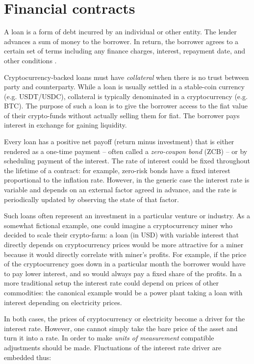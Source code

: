 \documentclass[runningheads]{llncs}
\begin{document}
\section{Financial contracts}
\label{background}

A loan is a form of debt incurred by an individual or other entity.
The lender advances a sum of money to the borrower. In return, the
borrower agrees to a certain set of terms including any finance charges,
interest, repayment date, and other conditions \cite{loan}.

Cryptocurrency-backed loans must have \emph{collateral} when there is no trust
between party and counterparty. While a loan is usually settled in a
stable-coin currency (e.g. USDT/USDC), collateral is typically denominated
in a cryptocurrency (e.g. BTC). The purpose of such a loan is to give
the borrower access to the fiat value of their crypto-funds without
actually selling them for fiat. The borrower pays interest in exchange
for gaining liquidity.

Every loan has a positive net payoff (return minus investment) that
is either rendered as a one-time payment -- often called a \emph{zero-coupon bond} (ZCB) -- or by scheduling
payment of the interest. The rate of interest could be fixed throughout
the lifetime of a contract: for example, zero-risk bonds have a fixed
interest proportional to the inflation rate.
However, in the generic case the interest rate is variable and depends
on an external factor agreed in advance, and the rate is periodically
updated by observing the state of that factor. 

Such loans often represent an investment in a particular venture or industry. As
a somewhat fictional example, one could imagine a cryptocurrency miner
who decided to scale their crypto-farm: a loan (in USD) with variable
interest that directly depends on cryptocurrency prices would be more
attractive for a miner because it would directly correlate with miner's
profits. For example, if the price of the cryptocurrency goes down
in a particular month the borrower would have to pay lower interest, and so would always pay a fixed share of the profits. In a more traditional
setup the interest rate could depend on prices of other commodities: the canonical example would be a power plant taking a loan
with interest depending on electricity prices. 

In both cases, the prices of
cryptocurrency or electricity become a driver for the interest
rate.
However, one cannot simply take the bare price of the asset and turn
it into a rate. In order to make \emph{units of measurement} compatible
adjustments should be made. Fluctuations of the interest rate driver
are embedded thus:
\end{document}

